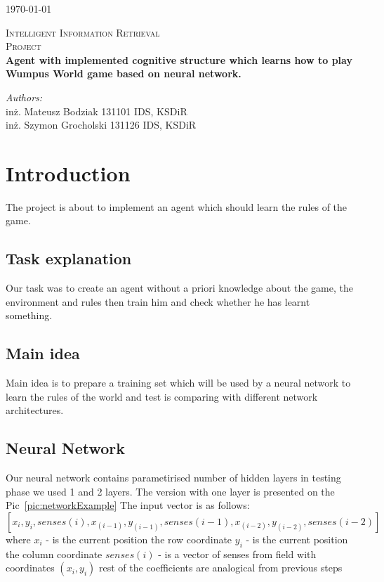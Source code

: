 \documentclass[a4paper]{article}
\begin{document}
\begin{flushright}
{\large \today}
\end{flushright}

\begin{center}



\textsc{\LARGE Intelligent Information Retrieval }\\[1.5cm]

\textsc{\Large Project }\\[0.5cm]

{ \huge \bfseries Agent with implemented cognitive structure which learns how to play Wumpus World game based on neural network. \\[0.4cm] }


\end{center}
\begin{minipage}{0.7\textwidth}
\begin{flushleft} \large
\emph{Authors:}\\
inż. Mateusz Bodziak 131101 IDS, KSDiR\\
inż. Szymon Grocholski 131126 IDS, KSDiR\\

\end{flushleft}
\end{minipage}

\section{Introduction}
The project is about to implement an agent which should learn the rules of the game. 
	\subsection{Task explanation}
	Our task was to create an agent without a priori knowledge about the game, the 
	environment and rules then train him and check whether he has learnt something.
	\subsection{Main idea}
	Main idea is to prepare a training set which will be used by a neural network to learn
	 the rules of the world and test is comparing with different network architectures.
	\subsection{Neural Network}
	Our neural network contains parametirised number of hidden layers in testing phase we 
	used 1 and 2 layers. The version with one layer is presented on the Pic~\ref{pic:networkExample} The input vector is as follows:
	$$
		[x_i, y_i, senses(i), x_(i-1), y_(i-1), senses(i-1), x_(i-2), y_(i-2), senses(i-2)]
	$$
	where 
		$x_i$ - is the current position the row coordinate
		$y_i$ - is the current position the column coordinate
		$senses(i)$ - is a vector of senses from field with coordinates $(x_i, y_i)$
		rest of the coefficients are analogical from previous steps
	
\end{document}
